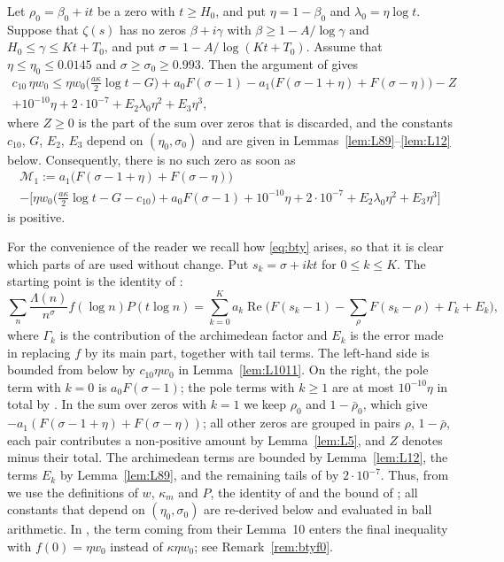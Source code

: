 \documentclass[11pt]{amsart}
\numberwithin{equation}{section}
\theoremstyle{definition}
\theoremstyle{remark}
\newcommand{\Rp}{\operatorname{Re}}
\begin{document}
Let $\rho_0 = \beta_0 + it$ be a zero with $t \geq H_0$, and put $\eta = 1 - \beta_0$ and $\lambda_0 = \eta\log t$.
Suppose that $\zeta(s)$ has no zeros $\beta + i\gamma$ with $\beta \geq 1 - A/\log\gamma$ and $H_0 \leq \gamma \leq Kt + T_0$, and put $\sigma = 1 - A/\log(Kt + T_0)$.
Assume that $\eta \leq \eta_0 \leq 0.0145$ and $\sigma \geq \sigma_0 \geq 0.993$.
Then the argument of \cite[Lemma~15]{BTY} gives
\begin{multline}\label{eq:bty}
c_{10}\,\eta w_0 \leq \eta w_0\Big(\frac{a\kappa}2\log t - G\Big) + a_0F(\sigma - 1) - a_1\big(F(\sigma - 1 + \eta) + F(\sigma - \eta)\big) - Z\\
+ 10^{-10}\eta + 2\cdot10^{-7} + E_2\lambda_0\eta^2 + E_3\eta^3,
\end{multline}
where $Z \geq 0$ is the part of the sum over zeros that is discarded, and the constants $c_{10}$, $G$, $E_2$, $E_3$ depend on $(\eta_0, \sigma_0)$ and are given in Lemmas~\ref{lem:L89}--\ref{lem:L12} below.
Consequently, there is no such zero as soon as
\begin{multline}\label{eq:margin1}
\mathcal M_1 := a_1\big(F(\sigma - 1 + \eta) + F(\sigma - \eta)\big)\\
- \Big[\eta w_0\Big(\frac{a\kappa}{2}\log t - G - c_{10}\Big) + a_0F(\sigma - 1) + 10^{-10}\eta + 2\cdot10^{-7} + E_2\lambda_0\eta^2 + E_3\eta^3\Big]
\end{multline}
is positive.

For the convenience of the reader we recall how \eqref{eq:bty} arises, so that it is clear which parts of \cite{BTY} are used without change.
Put $s_k = \sigma + ikt$ for $0 \leq k \leq K$.
The starting point is the identity of \cite[Lemma~6]{BTY}:
\[
\sum_n\frac{\Lambda(n)}{n^\sigma}f(\log n)P(t\log n) = \sum_{k=0}^Ka_k\Rp\Big(F(s_k - 1) - \sum_\rho F(s_k - \rho) + \Gamma_k + E_k\Big),
\]
where $\Gamma_k$ is the contribution of the archimedean factor and $E_k$ is the error made in replacing $f$ by its main part, together with tail terms.
The left-hand side is bounded from below by $c_{10}\eta w_0$ in Lemma~\ref{lem:L1011}.
On the right, the pole term with $k = 0$ is $a_0F(\sigma - 1)$; the pole terms with $k \geq 1$ are at most $10^{-10}\eta$ in total by \cite[Lemma~13]{BTY}.
In the sum over zeros with $k = 1$ we keep $\rho_0$ and $1 - \bar\rho_0$, which give $-a_1(F(\sigma - 1 + \eta) + F(\sigma - \eta))$; all other zeros are grouped in pairs $\rho$, $1 - \bar\rho$, each pair contributes a non-positive amount by Lemma~\ref{lem:L5}, and $Z$ denotes minus their total.
The archimedean terms are bounded by Lemma~\ref{lem:L12}, the terms $E_k$ by Lemma~\ref{lem:L89}, and the remaining tails of \cite[Lemma~6]{BTY} by $2\cdot10^{-7}$.
Thus, from \cite{BTY} we use the definitions of $w$, $\kappa_m$ and $P$, the identity of \cite[Lemma~6]{BTY} and the bound of \cite[Lemma~13]{BTY}; all constants that depend on $(\eta_0, \sigma_0)$ are re-derived below and evaluated in ball arithmetic.
In \cite{BTY}, the term coming from their Lemma~10 enters the final inequality with $f(0) = \eta w_0$ instead of $\kappa\eta w_0$; see Remark~\ref{rem:btyf0}.
\end{document}
